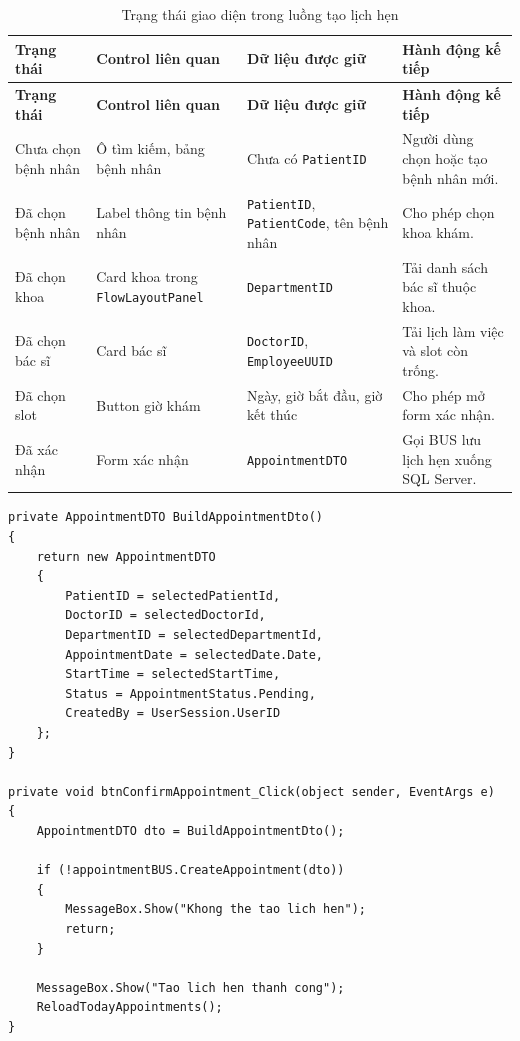 \documentclass[12pt,a4paper]{article}
\numberwithin{figure}{subsection}
\numberwithin{table}{subsection}
\newcounter{codecounter}
\newenvironment{codeblock}[2]{%
    \refstepcounter{codecounter}%
    \phantomsection%
    \label{#1}%
    \par\smallskip
}{%
    \par\smallskip
}
\begin{document}
\begin{longtable}{|p{3.2cm}|p{3.6cm}|p{3.6cm}|p{3.8cm}|}
\caption{Trạng thái giao diện trong luồng tạo lịch hẹn} \\
\hline
\textbf{Trạng thái} & \textbf{Control liên quan} & \textbf{Dữ liệu được giữ} & \textbf{Hành động kế tiếp} \\
\hline
\endfirsthead
\hline
\textbf{Trạng thái} & \textbf{Control liên quan} & \textbf{Dữ liệu được giữ} & \textbf{Hành động kế tiếp} \\
\hline
\endhead
Chưa chọn bệnh nhân & Ô tìm kiếm, bảng bệnh nhân & Chưa có \texttt{PatientID} & Người dùng chọn hoặc tạo bệnh nhân mới. \\
\hline
Đã chọn bệnh nhân & Label thông tin bệnh nhân & \texttt{PatientID}, \texttt{PatientCode}, tên bệnh nhân & Cho phép chọn khoa khám. \\
\hline
Đã chọn khoa & Card khoa trong \texttt{FlowLayoutPanel} & \texttt{DepartmentID} & Tải danh sách bác sĩ thuộc khoa. \\
\hline
Đã chọn bác sĩ & Card bác sĩ & \texttt{DoctorID}, \texttt{EmployeeUUID} & Tải lịch làm việc và slot còn trống. \\
\hline
Đã chọn slot & Button giờ khám & Ngày, giờ bắt đầu, giờ kết thúc & Cho phép mở form xác nhận. \\
\hline
Đã xác nhận & Form xác nhận & \texttt{AppointmentDTO} & Gọi BUS lưu lịch hẹn xuống SQL Server. \\
\hline
\end{longtable}

\begin{codeblock}{code:create-appointment-dto-build}{Tạo DTO lịch hẹn trước khi gọi BUS}
\begin{verbatim}
private AppointmentDTO BuildAppointmentDto()
{
    return new AppointmentDTO
    {
        PatientID = selectedPatientId,
        DoctorID = selectedDoctorId,
        DepartmentID = selectedDepartmentId,
        AppointmentDate = selectedDate.Date,
        StartTime = selectedStartTime,
        Status = AppointmentStatus.Pending,
        CreatedBy = UserSession.UserID
    };
}

private void btnConfirmAppointment_Click(object sender, EventArgs e)
{
    AppointmentDTO dto = BuildAppointmentDto();

    if (!appointmentBUS.CreateAppointment(dto))
    {
        MessageBox.Show("Khong the tao lich hen");
        return;
    }

    MessageBox.Show("Tao lich hen thanh cong");
    ReloadTodayAppointments();
}
\end{verbatim}
\end{codeblock}
\end{document}
